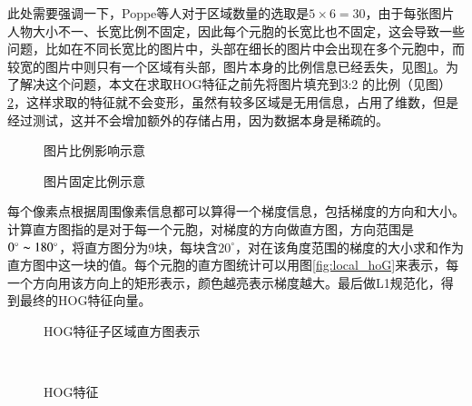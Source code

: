 此处需要强调一下，Poppe等人对于区域数量的选取是$5\times 6=30$，由于每张图片人物大小不一、长宽比例不固定，因此每个元胞的长宽比也不固定，这会导致一些问题，比如在不同长宽比的图片中，头部在细长的图片中会出现在多个元胞中，而较宽的图片中则只有一个区域有头部，图片本身的比例信息已经丢失，见图\ref{fig:broadthin}。为了解决这个问题，本文在求取HOG特征之前先将图片填充到3:2 的比例（见图）\ref{fig:broadthin2}，这样求取的特征就不会变形，虽然有较多区域是无用信息，占用了维数，但是经过测试，这并不会增加额外的存储占用，因为数据本身是稀疏的。
\begin{figure}[htbp]
  \centering
  \hspace{.5cm}
  \caption{图片比例影响示意}\label{fig:broadthin}
\end{figure}

\begin{figure}[htbp]
  \centering
  \hspace{.5cm}
  \caption{图片固定比例示意}\label{fig:broadthin2}
\end{figure}

每个像素点根据周围像素信息都可以算得一个梯度信息，包括梯度的方向和大小。计算直方图指的是对于每一个元胞，对梯度的方向做直方图，方向范围是$0^\circ\thicksim180^\circ$，将直方图分为9块，每块含$20^\circ$，对在该角度范围的梯度的大小求和作为直方图中这一块的值。每个元胞的直方图统计可以用图\ref{fig:local_hoG}来表示，每一个方向用该方向上的矩形表示，颜色越亮表示梯度越大。最后做L1规范化，得到最终的HOG特征向量。

\begin{figure}[htbp]
  \centering
  \hspace{.5cm}
  \hspace{.5cm}
  \caption{HOG特征子区域直方图表示}
\end{figure}

\begin{figure}[htbp]
  \centering
  \hspace{.5cm}
  \hspace{.5cm}
  \\
  \hspace{.5cm}
  \hspace{.5cm}
  \caption{HOG特征}
\end{figure}

